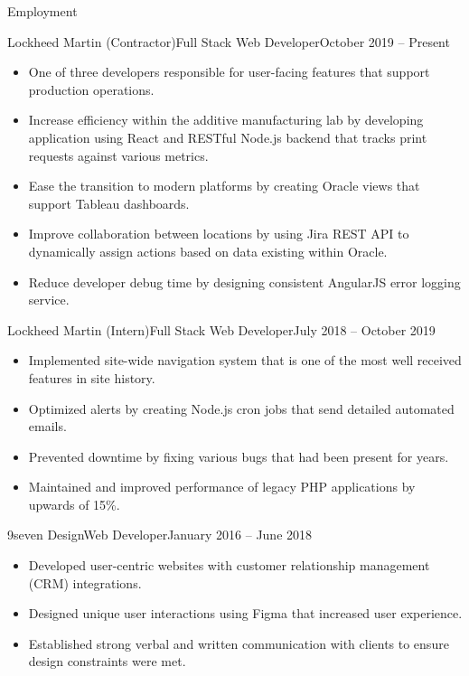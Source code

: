 \documentclass[calibri]{mcdowellcv}
\begin{document}
	\makeheader
	
	\begin{cvsection}{Employment}
		\begin{cvsubsection}{Lockheed Martin (Contractor)}{Full Stack Web Developer}{October 2019 -- Present}		
			\begin{itemize}
				\item One of three developers responsible for user-facing features that support production operations.
				\item Increase efficiency within the additive manufacturing lab by developing application using React and RESTful Node.js backend that tracks print requests against various metrics.
				\item Ease the transition to modern platforms by creating Oracle views that support Tableau dashboards.
				\item Improve collaboration between locations by using Jira REST API to dynamically assign actions based on data existing within Oracle.
				\item Reduce developer debug time by designing consistent AngularJS error logging service.
			\end{itemize}
		\end{cvsubsection}
		
		\begin{cvsubsection}{Lockheed Martin (Intern)}{Full Stack Web Developer}{July 2018 -- October 2019}	
			\begin{itemize}
				\item Implemented site-wide navigation system that is one of the most well received features in site history.
				\item Optimized alerts by creating Node.js cron jobs that send detailed automated emails.
				\item Prevented downtime by fixing various bugs that had been present for years.
				\item Maintained and improved performance of legacy PHP applications by upwards of 15\%.
			\end{itemize}
		\end{cvsubsection}
		
		\begin{cvsubsection}{9seven Design}{Web Developer}{January 2016 -- June 2018}		
			\begin{itemize}
				\item Developed user-centric websites with customer relationship management (CRM) integrations.
				\item Designed unique user interactions using Figma that increased user experience.
				\item Established strong verbal and written communication with clients to ensure design constraints were met.
			\end{itemize}
		\end{cvsubsection}
	\end{cvsection}
	
\end{document}
